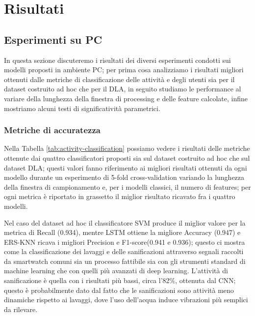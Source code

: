 \chapter{Risultati}
\label{cap:risultati}

\section{Esperimenti su PC}
\label{sec:esperimenti-su-pc}

In questa sezione discuteremo i risultati dei diversi esperimenti condotti sui modelli proposti in ambiente PC; per prima cosa analizziamo i risultati migliori ottenuti dalle metriche di classificazione delle attività e degli utenti sia per il dataset costruito ad hoc che per il DLA, in seguito studiamo le performance al variare della lunghezza della finestra di processing e delle feature calcolate, infine mostriamo alcuni testi di significatività parametrici.

\subsection{Metriche di accuratezza}
\label{ssec:metriche-di-accuratezza}

Nella Tabella \ref{tab:activity-classification} possiamo vedere i risultati delle metriche ottenute dai quattro classificatori proposti sia sul dataset costruito ad hoc che sul dataset DLA; questi valori fanno riferimento ai migliori risultati ottenuti da ogni modello durante un esperimento di 5-fold cross-validation variando la lunghezza della finestra di campionamento e, per i modelli classici, il numero di features; per ogni metrica è riportato in grassetto il miglior risultato ricavato fra i quattro modelli.

Nel caso del dataset ad hoc il classificatore SVM produce il miglior valore per la metrica di Recall (0.934), mentre LSTM ottiene la migliore Accuracy (0.947) e ERS-KNN ricava i migliori Precision e F1-score(0.941 e 0.936); questo ci mostra come la classificazione dei lavaggi e delle sanificazioni attraverso segnali raccolti da smartwatch comuni sia un processo fattibile sia con gli strumenti standard di machine learning che con quelli più avanzati di deep learning. L'attività di sanificazione è quella con i risultati più bassi, circa l'82\%, ottenuta dal CNN; questo è probabilmente dato dal fatto che le sanificazioni sono attività meno dinamiche rispetto ai lavaggi, dove l'uso dell'acqua induce vibrazioni più semplici da rilevare.

